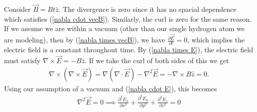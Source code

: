 \documentclass[11pt]{article}
\begin{document}
Consider $\vec{B} = Bt \hat{z}$. The divergence is zero since it has no spacial dependence which satisfies (\ref{nabla cdot vecB}). Similarly, the curl is zero for the same reason. If we assume we are within a vacuum (other than our single hydrogen atom we are modeling), then by (\ref{nabla times vecB}), we have $\frac{\partial \vec{E}}{\partial t} = 0$, which implies the electric field is a constant throughout time. By (\ref{nabla times E}), the electric field must satisfy $\nabla \times \vec{E} = -B \hat{z}$. If we take the curl of both sides of this we get
\begin{align}
\nabla \times(\nabla \times \vec{E}) = \nabla (\nabla \cdot \vec{E})- \nabla^2 \vec{E} = -\nabla \times B \hat{z} =0.
\end{align}
Using our assumption of a vacuum and (\ref{nabla cdot E}), this becomes 
\begin{align}
 \nabla^2 \vec{E} =  0 \implies \frac{\partial^2 E_x}{\partial x^2}+\frac{\partial^2 E_y}{\partial y^2}+\frac{\partial^2 E_z}{\partial z^2}=0 \label{del^2 E=0}
\end{align}
\end{document}
